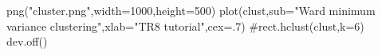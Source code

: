 png("cluster.png",width=1000,height=500)
plot(clust,sub="Ward minimum variance clustering",xlab="TR8 tutorial",cex=.7)
#rect.hclust(clust,k=6)
dev.off()

